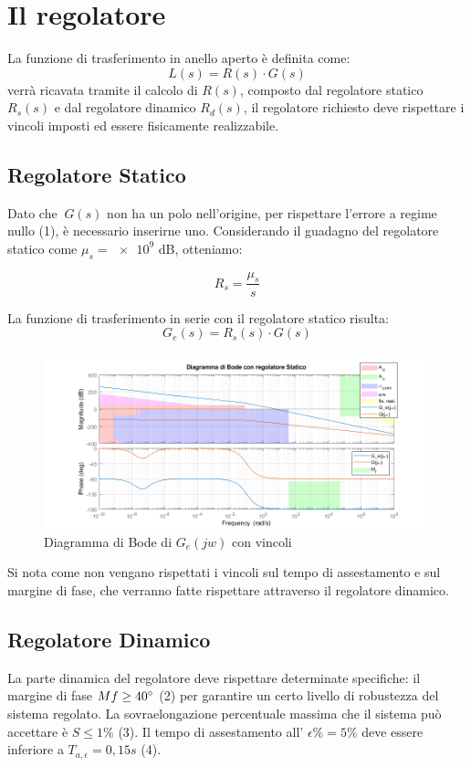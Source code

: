 \documentclass{article}
\begin{document}
\section{Il regolatore}
La funzione di trasferimento in anello aperto è definita come:
\[ L(s) = R(s) \cdot G(s)  \]
verrà ricavata tramite il calcolo di $R(s)$, composto dal regolatore statico $R_s(s)$ e dal regolatore dinamico $R_d(s)$, il regolatore richiesto deve rispettare i vincoli imposti ed essere fisicamente realizzabile.
\subsection{Regolatore Statico}

Dato che $\ G(s)$ non ha un polo nell'origine, per rispettare l'errore a regime nullo (1), è necessario inserirne uno. Considerando il guadagno del regolatore statico come  $ \mu_s =\num{e9}$ dB, otteniamo:

\[ R_s = \frac{\mu_s}{s}  \]


La funzione di trasferimento in serie con il regolatore statico risulta:
\[ G_e(s) = R_s(s) \cdot G(s) \]

\begin{figure}[!h]
\centering
\includegraphics[width=1\textwidth]{grafici/fig2.png}
\caption{\label{fig:orbit}Diagramma di Bode di $G_e(jw)$ con vincoli}
\end{figure}

Si nota come non vengano rispettati i vincoli sul tempo di assestamento e sul margine di fase, che verranno fatte rispettare attraverso il regolatore dinamico.


\subsection{Regolatore Dinamico}
 La parte dinamica del regolatore deve rispettare determinate specifiche: il margine di fase $ Mf \geq 40\degree $ (2) per garantire un certo livello di robustezza del sistema regolato. 
La sovraelongazione percentuale massima che il sistema può accettare è $ S \leq 1\% $ (3). Il tempo di assestamento all' $ \epsilon\% = 5\%$ deve essere inferiore a $ T_{a,\epsilon}=0,15s $ (4).\\
\end{document}
